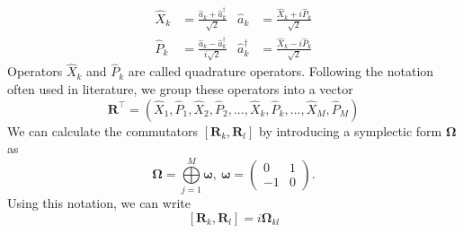 \documentclass[12pt, a4paper,  nobibnotes]{article}
\newcommand{\op}[1]{\hat{#1}}
\begin{document}
\begin{align}
  \op X_k &= \frac{\op a_k+\op a_k^\dagger}{\sqrt{2}}  & \op a_k &= \frac{\op X_k + i\op P_k}{\sqrt{2}}  \\ 
  \op P_k &= \frac{\op a_k-\op a_k^\dagger}{i\sqrt{2}} & \op a_k^\dagger &= \frac{\op X_k - i\op P_k}{\sqrt{2}}
   \label{eq:jwtransform}
\end{align}
Operators $\op X_k$ and $\op P_k$ are called quadrature operators. Following the notation often used in literature, we group these operators into a vector 
\begin{equation}
    \mathbf R^\top = (\op X_1, \op P_1, \op X_2, \op P_2, ..., \op X_k, \op P_k, ..., \op X_M, \op P_M)
    \label{eq:xidef}
\end{equation}
We can calculate the commutators $\left[\mathbf R_k,\mathbf R_l\right]$ by introducing a symplectic form $\pmb\Omega$ as
\begin{equation}
    \pmb\Omega = \bigoplus\limits_{j=1}^{M}\pmb\omega,~\pmb\omega = 
    \begin{pmatrix}
    0 & 1 \\
    -1 & 0
    \end{pmatrix}.
\end{equation}
Using this notation, we can write
\begin{equation}
    \left[\mathbf R_k,\mathbf R_l\right] = i\pmb\Omega_{kl}
\end{equation}
\end{document}
